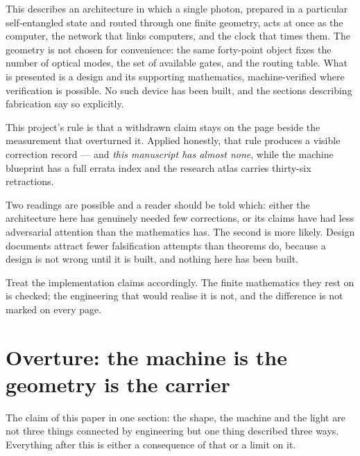 \documentclass[11pt]{article}
\begin{document}

\begin{plainbox}
This describes an architecture in which a single photon, prepared in a particular
self-entangled state and routed through one finite geometry, acts at once as the computer,
the network that links computers, and the clock that times them. The geometry is not chosen
for convenience: the same forty-point object fixes the number of optical modes, the set of
available gates, and the routing table. What is presented is a design and its supporting
mathematics, machine-verified where verification is possible. No such device has been
built, and the sections describing fabrication say so explicitly.
\end{plainbox}

\begin{warnbox}
This project's rule is that a withdrawn claim stays on the page beside the measurement that
overturned it. Applied honestly, that rule produces a visible correction record --- and
\emph{this manuscript has almost none}, while the machine blueprint has a full errata index
and the research atlas carries thirty-six retractions.

Two readings are possible and a reader should be told which: either the architecture here
has genuinely needed few corrections, or its claims have had less adversarial attention
than the mathematics has. The second is more likely. Design documents attract fewer
falsification attempts than theorems do, because a design is not wrong until it is built,
and nothing here has been built.

Treat the implementation claims accordingly. The finite mathematics they rest on is
checked; the engineering that would realise it is not, and the difference is not marked on
every page.
\end{warnbox}

\tableofcontents

\section{Overture: the machine is the geometry is the carrier}\label{sec:overture}

\begin{plainbox}
The claim of this paper in one section: the shape, the machine and the light are
not three things connected by engineering but one thing described three ways. Everything
after this is either a consequence of that or a limit on it.
\end{plainbox}
\end{document}
